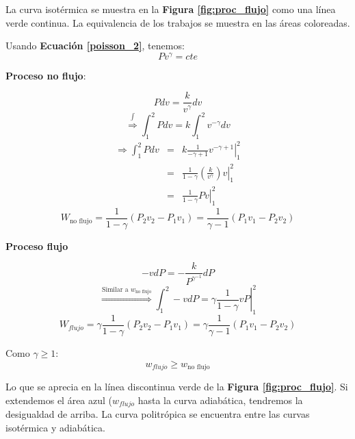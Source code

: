             La curva isotérmica se muestra en la \textbf{Figura \ref{fig:proc_flujo}} como una línea verde continua. La equivalencia de los trabajos se muestra en las áreas coloreadas.
            
            
            Usando \textbf{Ecuación \ref{poisson_2}}, tenemos:
            \[Pv^{\gamma} = cte\]
            
            \textbf{Proceso no flujo}:
            
            \[Pdv = \frac{k}{v^{\gamma}}dv\]
            \[\overset{\int}{\Rightarrow} \int_{1}^{2} Pdv = k \int_{1}^{2} v^{-\gamma}dv\]
            \[\begin{matrix}
                \Rightarrow \int_{1}^{2} Pdv & = & \left . k \frac{1}{-\gamma + 1}v^{-\gamma + 1} \right |_{1}^{2} \\
                & = & \left . \frac{1}{1 - \gamma} \left ( \frac{k}{v^{\gamma}} \right ) v \right |_{1}^{2} \\
                & = & \left . \frac{1}{1-\gamma} Pv \right |_{1}^{2}
            \end{matrix}\]
            \begin{equation}
            \label{trabajo_no_flujo_adiab}
                W_{\text{no flujo}} = \frac{1}{1-\gamma}\left ( P_{2}v_{2} - P_{1}v_{1} \right ) = \frac{1}{\gamma - 1}\left ( P_{1}v_{1} - P_{2}v_{2} \right )
            \end{equation}
            
            \textbf{Proceso flujo}
            
            \[-vdP = - \frac{k}{P^{\gamma^{-1}}}dP\]
            \[\overset{\text{Similar a }w_{\text{no flujo}}}{\Rightarrow} \int_{1}^{2} -vdP = \left . \gamma \frac{1}{1-\gamma}vP \right |_{1}^{2}\]
            \begin{equation}
            \label{trabajo_flujo_adiab}
                W_{flujo} = \gamma \frac{1}{1-\gamma} \left ( P_{2}v_{2} - P_{1}v_{1} \right ) = \gamma \frac{1}{\gamma - 1} \left ( P_{1}v_{1} - P_{2}v_{2} \right )
            \end{equation}
            
            Como \(\gamma \geq 1\):
            \[w_{flujo} \geq w_{\text{no flujo}}\]
            
            Lo que se aprecia en la línea discontinua verde de la \textbf{Figura \ref{fig:proc_flujo}}. Si extendemos el área azul (\(w_{flujo}\) hasta la curva adiabática, tendremos la desigualdad de arriba. La curva politrópica se encuentra entre las curvas isotérmica y adiabática.
            
